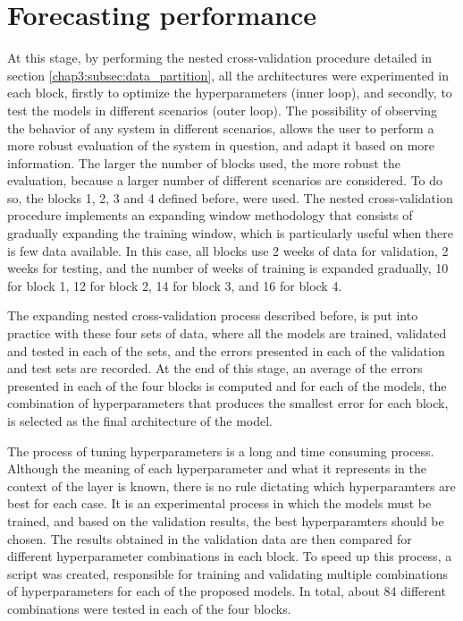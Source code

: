 \section{Forecasting performance}\label{chap3:section:stage_1}

At this stage, by performing the nested cross-validation procedure detailed in section \ref{chap3:subsec:data_partition}, all the architectures were experimented in each block, firstly to optimize the hyperparameters (inner loop), and secondly, to test the models in different scenarios (outer loop). The possibility of observing the behavior of any system in different scenarios, allows the user to perform a more robust evaluation of the system in question, and adapt it based on more information. The larger the number of blocks used, the more robust the evaluation, because a larger number of different scenarios are considered. To do so, the blocks 1, 2, 3 and 4 defined before, were used. The nested cross-validation procedure implements an expanding window methodology that consists of gradually expanding the training window, which is particularly useful when there is few data available. In this case, all blocks use 2 weeks of data for validation, 2 weeks for testing, and the number of weeks of training is expanded gradually, 10 for block 1, 12 for block 2, 14 for block 3, and 16 for block 4.

The expanding nested cross-validation process described before, is put into practice with these four sets of data, where all the models are trained, validated and tested in each of the sets, and the errors presented in each of the validation and test sets are recorded. At the end of this stage, an average of the errors presented in each of the four blocks is computed and for each of the models, the combination of hyperparameters that produces the smallest error for each block, is selected as the final architecture of the model. 

The process of tuning hyperparameters is a long and time consuming process. Although the meaning of each hyperparameter and what it represents in the context of the layer is known, there is no rule dictating which hyperparamters are best for each case. It is an experimental process in which the models must be trained, and based on the validation results, the best hyperparamters should be chosen. The results obtained in the validation data are then compared for different hyperparameter combinations in each block. To speed up this process, a script \cite{code} was created, responsible for training and validating multiple combinations of hyperparameters for each of the proposed models. In total, about 84 different combinations were tested in each of the four blocks.

